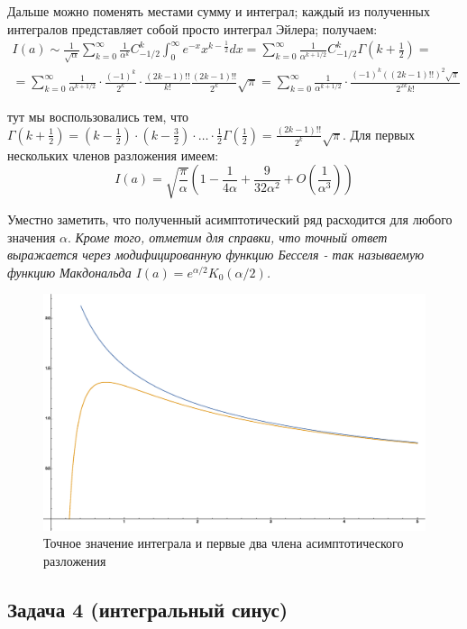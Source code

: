 \documentclass[a4paper,12pt]{article}
\begin{document}
\noindent
Дальше можно поменять местами сумму и интеграл; каждый из полученных
интегралов представляет собой просто интеграл Эйлера; получаем:
\begin{multline*}
I(a)\sim\frac{1}{\sqrt{\alpha}}\sum_{k=0}^{\infty}\frac{1}{\alpha^{k}}C_{-1/2}^{k}\int_{0}^{\infty}e^{-x}x^{k-\frac{1}{2}}dx=\sum_{k=0}^{\infty}\frac{1}{\alpha^{k+1/2}}C_{-1/2}^{k}\Gamma\left(k+\frac{1}{2}\right)=\\
=\sum_{k=0}^{\infty}\frac{1}{\alpha^{k+1/2}}\cdot\frac{(-1)^{k}}{2^{k}}\cdot\frac{\left(2k-1\right)!!}{k!}\frac{\left(2k-1\right)!!}{2^{k}}\sqrt{\pi}=\sum_{k=0}^{\infty}\frac{1}{\alpha^{k+1/2}}\cdot\frac{(-1)^{k}((2k-1)!!)^{2}\sqrt{\pi}}{2^{2k}k!}
\end{multline*}

\noindent
тут мы воспользовались тем, что $\Gamma\left(k+\frac{1}{2}\right)=\left(k-\frac{1}{2}\right)\cdot\left(k-\frac{3}{2}\right)\cdot\dots\cdot\frac{1}{2}\Gamma\left(\frac{1}{2}\right)=\frac{(2k-1)!!}{2^{k}}\sqrt{\pi}$.
Для первых нескольких членов разложения имеем:
\[
I(a)=\sqrt{\frac{\pi}{\alpha}}\left(1-\frac{1}{4\alpha}+\frac{9}{32\alpha^{2}}+O\left(\frac{1}{\alpha^{3}}\right)\right)
\]

\noindent
Уместно заметить, что полученный асимптотический ряд расходится для любого значения $\alpha$.
\textit{Кроме того, отметим для справки, что точный ответ
выражается через модифицированную функцию Бесселя - так называемую
функцию Макдональда $I(a)=e^{\alpha/2}K_{0}(\alpha/2)$.}

\begin{figure}[h]
\caption{Точное значение интеграла и первые два члена асимптотического разложения}
\centering
\includegraphics[width=0.65\columnwidth]{besselk.eps}
\end{figure}



\subsection*{Задача 4 (интегральный синус)}
\end{document}
